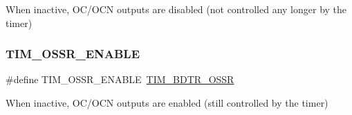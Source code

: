 When inactive, O\+C/\+O\+CN outputs are disabled (not controlled any longer by the timer) \mbox{\label{group___t_i_m___o_s_s_r___off___state___selection__for___run__mode__state_ga5d21918f173eca946748a1fbc177daa5}} 
\subsubsection{\texorpdfstring{TIM\_OSSR\_ENABLE}{TIM\_OSSR\_ENABLE}}
{\footnotesize\ttfamily \#define T\+I\+M\+\_\+\+O\+S\+S\+R\+\_\+\+E\+N\+A\+B\+LE~\mbox{\hyperlink{group___peripheral___registers___bits___definition_gaf9435f36d53c6be1107e57ab6a82c16e}{T\+I\+M\+\_\+\+B\+D\+T\+R\+\_\+\+O\+S\+SR}}}

When inactive, O\+C/\+O\+CN outputs are enabled (still controlled by the timer) 